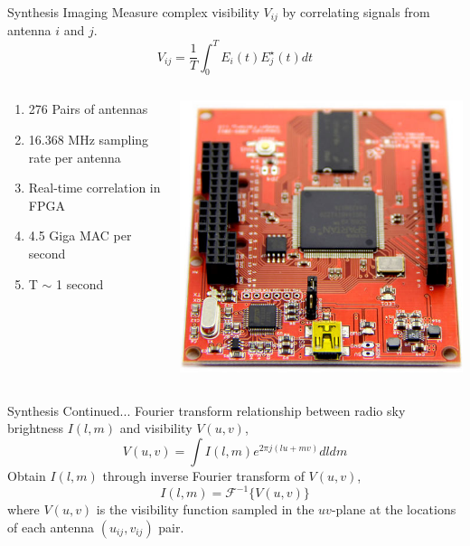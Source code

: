 \documentclass[ignorenonframetext]{beamer}
\begin{document}
\begin{frame}{Synthesis Imaging}
Measure complex visibility $V_{ij}$ by correlating signals from antenna $i$ and $j$.
\[ V_{ij} = \frac{1}{T} \int_0^T E_i(t) E_j^{\star}(t) dt \]
\begin{columns}
 \begin{column}{0.55\linewidth}
\begin{enumerate}
 \item 276 Pairs of antennas
 \item 16.368 MHz sampling rate per antenna
 \item Real-time correlation in FPGA
 \item 4.5 Giga MAC per second
 \item T $\sim$ 1 second
\end{enumerate}
 \end{column}
 \begin{column}{0.45\linewidth}
 \includegraphics[width=\linewidth]{fig/papilio_pro.jpg}
 \end{column}
\end{columns}

\end{frame}

\begin{frame}{Synthesis Continued...}
Fourier transform relationship between radio sky brightness $I(l,m)$ and
visibility $V(u,v)$,
\[
  V(u,v) = \int I(l,m) e^{2\pi j(lu  + mv)} dl dm
\]
Obtain $I(l,m)$ through inverse Fourier transform of $V(u,v)$, 
\[
 I(l,m) = \mathscr{F}^{-1}\{V(u,v)\}
\]
where $V(u,v)$ is the visibility function sampled in the $uv$-plane at the locations of each antenna $(u_{ij},v_{ij})$ pair. 
\end{frame}
\end{document}
